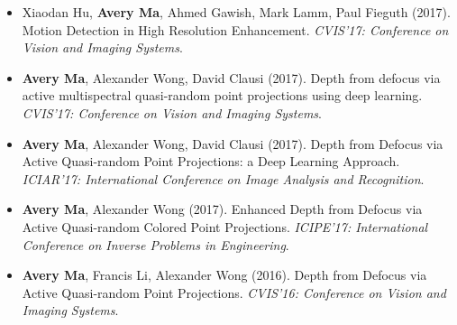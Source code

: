 \begin{adjustwidth}{\indentleft}{\indentright}
\begin{itemize}
            \item Xiaodan Hu, \textbf{Avery Ma}, Ahmed Gawish, Mark Lamm, Paul Fieguth (2017). Motion Detection in High Resolution Enhancement. \emph{CVIS'17: Conference on Vision and Imaging Systems}.
            
            \item \textbf{Avery Ma}, Alexander Wong, David Clausi (2017). Depth from defocus via active multispectral quasi-random point projections using deep learning. \emph{CVIS'17: Conference on Vision and Imaging Systems}.
            
            \item \textbf{Avery Ma}, Alexander Wong, David Clausi (2017). Depth from Defocus via Active Quasi-random Point Projections: a Deep Learning Approach. \emph{ICIAR'17: International Conference on Image Analysis and Recognition}.
            
            \item \textbf{Avery Ma}, Alexander Wong (2017). Enhanced Depth from Defocus via Active Quasi-random Colored Point Projections. \emph{ICIPE'17: International Conference on Inverse Problems in Engineering}.
                   
            \item \textbf{Avery Ma}, Francis Li, Alexander Wong (2016). Depth from Defocus via Active Quasi-random Point Projections. \emph{CVIS'16: Conference on Vision and Imaging Systems}.
       
        \end{itemize}
        \hfill
        
        
 
        
    \end{adjustwidth}
